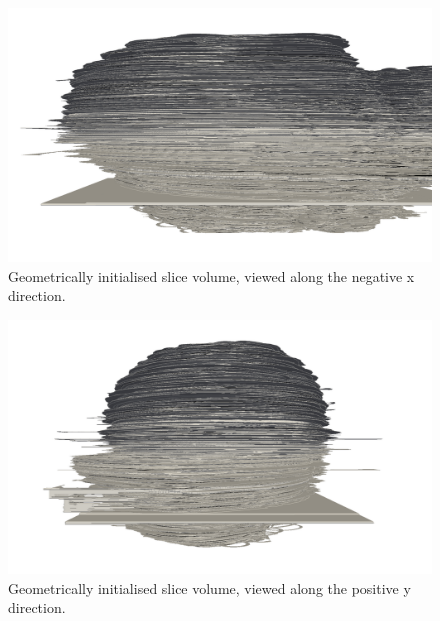 	\begin{figure}
	  \centering
	  \includegraphics[width=0.9\textheight]{Ch6/Figs/Rat28/contours/whole_negative_x_geometric}
	  \caption{Geometrically initialised slice volume, viewed along the negative x direction.}
	  \label{fig:negative_x_geometric_contour}
	\end{figure}

	\begin{figure}
	  \centering
	  \includegraphics[width=0.9\textheight]{Ch6/Figs/Rat28/contours/whole_positive_y_geometric}
	  \caption{Geometrically initialised slice volume, viewed along the positive y direction.}
	  \label{fig:positive_y_geometric_contour}
	\end{figure}
  
